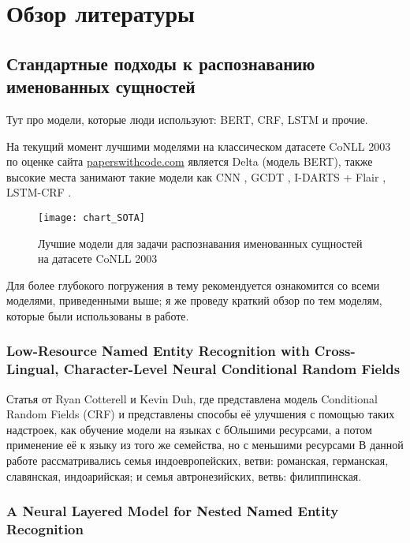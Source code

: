 \section{Обзор литературы}

\subsection{Стандартные подходы к распознаванию именованных сущностей}

Тут про модели, которые люди используют: BERT, CRF, LSTM и прочие.

На текущий момент лучшими моделями на классическом датасете CoNLL 2003 по оценке сайта \href{https://paperswithcode.com/sota/named-entity-recognition-ner-on-conll-2003}{paperswithcode.com} является Delta \cite{delta} (модель BERT), также высокие места занимают такие модели как CNN \cite{CNN_top_2_SOTA}, GCDT \cite{Liu:19}, I-DARTS + Flair \cite{jiang-etal-2019-improved}, LSTM-CRF \cite{strakova-etal-2019-neural}. 

\begin{figure}[h]
\caption{Лучшие модели для задачи распознавания именованных сущностей на датасете CoNLL 2003}
\texttt{[image: chart\_SOTA]}
\label{fig:chart_SOTA}
\end{figure}

Для более глубокого погружения в тему рекомендуется ознакомится со всеми моделями, приведенными выше; я же проведу краткий обзор по тем моделям, которые были использованы в работе.

\subsubsection{Low-Resource Named Entity Recognition with Cross-Lingual, Character-Level Neural Conditional Random Fields} \cite{cotterell-duh-2017-low}

Статья от Ryan Cotterell и Kevin Duh, где представлена модель Conditional Random Fields (CRF) и представлены способы её улучшения с помощью таких надстроек, как обучение модели на языках с бОльшими ресурсами, а потом применение её к языку из того же семейства, но с меньшими ресурсами В данной работе рассматривались семья индоевропейских, ветви: романская, германская, славянская, индоарийская; и семья автронезийских, ветвь: филиппинская.

\subsubsection{A Neural Layered Model for Nested Named Entity Recognition} \cite{ju-etal-2018-neural}

